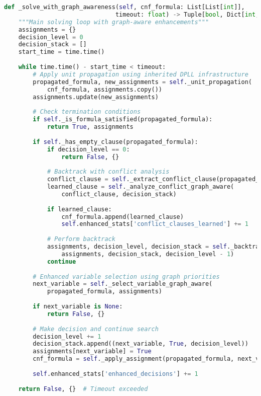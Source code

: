 \begin{lstlisting}[language=Python, caption=Graph-Aware DPLL Search Implementation]
def _solve_with_graph_awareness(self, cnf_formula: List[List[int]], 
                               timeout: float) -> Tuple[bool, Dict[int, bool]]:
    """Main solving loop with graph-aware enhancements"""
    assignments = {}
    decision_level = 0
    decision_stack = []
    start_time = time.time()
    
    while time.time() - start_time < timeout:
        # Apply unit propagation using inherited DPLL infrastructure
        propagated_formula, new_assignments = self._unit_propagation(
            cnf_formula, assignments.copy())
        assignments.update(new_assignments)
        
        # Check termination conditions
        if self._is_formula_satisfied(propagated_formula):
            return True, assignments
        
        if self._has_empty_clause(propagated_formula):
            if decision_level == 0:
                return False, {}
            
            # Backtrack with conflict analysis
            conflict_clause = self._extract_conflict_clause(propagated_formula)
            learned_clause = self._analyze_conflict_graph_aware(
                conflict_clause, decision_stack)
            
            if learned_clause:
                cnf_formula.append(learned_clause)
                self.enhanced_stats['conflict_clauses_learned'] += 1
            
            # Perform backtrack
            assignments, decision_level, decision_stack = self._backtrack_to_level(
                assignments, decision_stack, decision_level - 1)
            continue
        
        # Enhanced variable selection using graph priorities
        next_variable = self._select_variable_graph_aware(
            propagated_formula, assignments)
        
        if next_variable is None:
            return False, {}
        
        # Make decision and continue search
        decision_level += 1
        decision_stack.append((next_variable, True, decision_level))
        assignments[next_variable] = True
        cnf_formula = self._apply_assignment(propagated_formula, next_variable, True)
        
        self.enhanced_stats['enhanced_decisions'] += 1
    
    return False, {}  # Timeout exceeded
\end{lstlisting}

